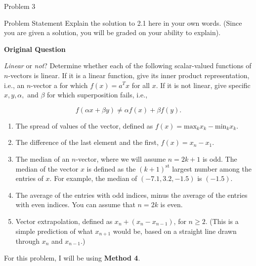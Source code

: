 \begin{problem}{Problem 3}
    \begin{statement}{Problem Statement}
        Explain the solution to 2.1 here in your own words. (Since you are given a solution, you will be graded on your ability to explain). \vspace*{1em}

        \textbf{Original Question} \vspace*{1em}

        \textit{Linear} or \textit{not}? Determine whether each of the following scalar-valued functions of $n$-vectors is linear. If it is a linear function, give its inner product representation, 
        i.e., an $n$-vector a for which $f(x)=a^{T}x$ for all $x$. If it is not linear, give specific $x, y, \alpha,$ and $\beta$ for which superposition fails, i.e.,

        \begin{equation*}
            f(\alpha x + \beta y) \neq \alpha f(x) + \beta f(y).
        \end{equation*}

        \begin{enumerate}[label=(\alph*)]
            \item The spread of values of the vector, defined as $f(x) = \text{max}_{k}x_{k} - \text{min}_{k}x_{k}$.
            \item The difference of the last element and the first, $f(x) = x_{n}-x_{1}$.
            \item The median of an $n$-vector, where we will assume $n = 2k + 1$ is odd. The median of the vector $x$ is defined as the $(k+1)^{\text{st}}$ largest number among the entries of $x$.
            For example, the median of $(-7.1,3.2,-1.5)$ is $(-1.5)$.
            \item The average of the entries with odd indices, minus the average of the entries with even indices. You can assume that $n = 2k$ is even.
            \item Vector extrapolation, defined as $x_{n} + (x_{n}-x_{n-1})$, for $n \geq 2$. (This is a simple prediction of what $x_{n+1}$ would be, based on a straight line drawn through $x_{n}$
            and $x_{n-1}$.)
        \end{enumerate}
    \end{statement}

    \begin{highlight}
        For this problem, I will be using \textbf{Method 4}. \vspace*{1em}


\end{highlight}
\end{problem}
